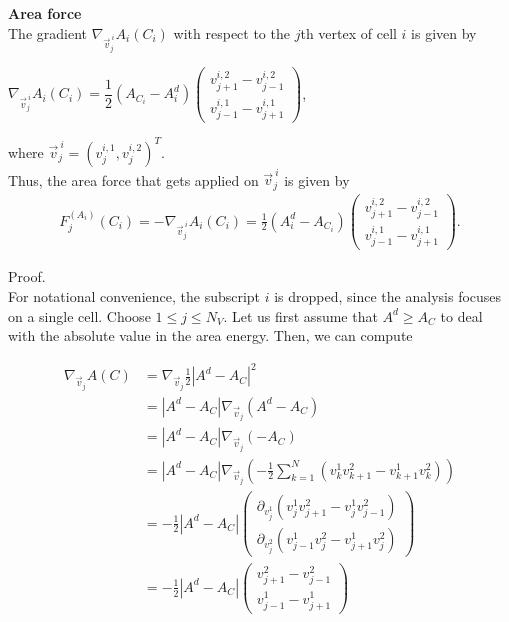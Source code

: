 \begin{proposition} \textbf{Area force} \label{force:area}\\
	The gradient $\nabla_{\vec{v}^{\: i}_j} A_i(C_i)$ with respect to the $j$th vertex of cell $i$ is given by 
	\begin{center}
		$\nabla_{\vec{v}^{\: i}_j} A_i(C_i) = \dfrac{1}{2} (A_{C_i} - A_i^d) \begin{pmatrix} v_{j+1}^{i,2} - v_{j-1}^{i,2} \\[0.5em]  v_{j-1}^{i,1} - v_{j+1}^{i,1} \end{pmatrix}$, 
	\end{center}
	where $\vec{v}^{\: i}_j = (v_{j}^{i,1}, v_{j}^{i,2})^T$. \\

	Thus, the area force that gets applied on $\vec{v}^{\: i}_j$ is given by 
	\begin{align}
		F_{j}^{(A_i)}(C_i) 
		= - \nabla_{\vec{v}^{\: i}_j} A_i(C_i) 
		= \frac{1}{2}(A_i^d - A_{C_i}) \begin{pmatrix} v_{j+1}^{i,2} - v_{j-1}^{i,2} \\[0.5em]  v_{j-1}^{i,1} - v_{j+1}^{i,1} \end{pmatrix}.
	\end{align}



	Proof.\\
	For notational convenience, the subscript $i$ is dropped, since the analysis focuses on a single cell.
	Choose $1 \leq j \leq N_V$.  
	Let us first assume that $A^d \geq A_{C}$ to deal with the absolute value in the area energy. 
	Then, we can compute 
 
	\begin{align*}
		\nabla_{\vec{v}_j} A(C) &= \nabla_{\vec{v}_j} \frac{1}{2} | A^d - A_{C} |^2  \\ 
		&=   |A^d - A_{C}| \nabla_{\vec{v}_j} ( A^d - A_{C})  \\
		&=   |A^d - A_{C}| \nabla_{\vec{v}_j} ( - A_{C}) \\ 
		&=   |A^d - A_{C}| \nabla_{\vec{v}_j} ( - \frac{1}{2} \sum\limits_{k = 1}^{N} (v_k^1 v_{k+1}^2 - v_{k+1}^1 v_k^2)) \\[0.5em]  
		&=   - \frac{1}{2} |A^d - A_{C}| \begin{pmatrix}
			\partial_{v_j^1} (v_j^1 v_{j+1}^2 - v_j^1 v_{j-1}^2)  \\[0.5em]
			\partial_{v_j^2} (v_{j-1}^1 v_j^2 - v_{j+1}^1 v_j^2)
		\end{pmatrix} \\[0.5em] 
		&=   - \frac{1}{2} |A^d - A_{C}| \begin{pmatrix}
			  v_{j+1}^2 - v_{j-1}^2  \\
			 v_{j-1}^1  - v_{j+1}^1 
		\end{pmatrix} 
	\end{align*}


\end{proposition}
